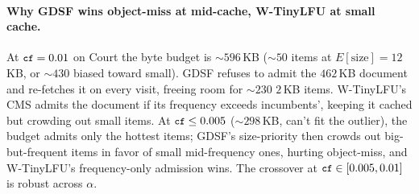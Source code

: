 \documentclass[letterpaper,twocolumn,10pt]{article}
\newcommand{\code}[1]{\texttt{\small #1}}
\begin{document}
\paragraph{Why GDSF wins object-miss at mid-cache, W-TinyLFU at
small cache.} At $\code{cf} = 0.01$ on Court the byte budget is
$\sim 596$\,KB ($\sim 50$ items at $E[\text{size}]=12$\,KB, or
$\sim 430$ biased toward small). GDSF refuses to admit the
$462$\,KB document and re-fetches it on every visit, freeing room
for $\sim 230$ $2$\,KB items. W-TinyLFU's CMS admits the document
if its frequency exceeds incumbents', keeping it cached but
crowding out small items. At $\code{cf} \leq 0.005$ ($\sim 298$\,KB,
can't fit the outlier), the budget admits only the hottest items;
GDSF's size-priority then crowds out big-but-frequent items in
favor of small mid-frequency ones, hurting object-miss, and
W-TinyLFU's frequency-only admission wins. The crossover at
$\code{cf} \in [0.005, 0.01]$ is robust across $\alpha$.
\end{document}
